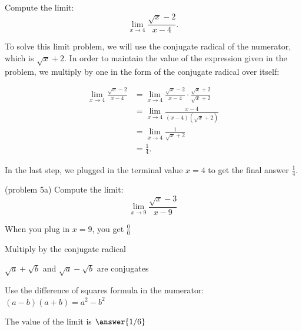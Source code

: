 \documentclass[handout]{ximera}
\begin{document}
\begin{example}[example 5]
Compute the limit:
\[\lim_{x \to 4} \frac{\sqrt{x} - 2}{x-4}.\]

To solve this limit problem, we will use the conjugate radical of the
numerator, which is $\sqrt{x} + 2$.  In order to maintain the value of
the expression given in the problem, we multiply by one in the form of the conjugate radical
over itself:



\begin{align*}
\lim_{x \to 4} \frac{\sqrt{x}- 2}{x-4} &=
\lim_{x \to 4} \frac{\sqrt{x} -2}{x-4}\cdot \frac{\sqrt{x} +2}{\sqrt{x}+2} \\[.4 em]
 &= \lim_{x \to 4} \frac{x-4}{(x-4)(\sqrt{x}+2)} \\[.4 em]
&= \lim_{x \to 4}\frac{1}{\sqrt{x}+2} \\[.4 em]
&= \frac 14.
\end{align*}

In the last step, we plugged in the terminal value $x=4$ to get the final answer $\frac14$.

\end{example}



\begin{problem}(problem 5a)
  Compute the limit:
  \[
  \lim_{x \to 9} \frac{\sqrt{x}-3}{x-9}
  \]
  
    \begin{hint}
      When you plug in $x = 9$, you get $\frac00$
    \end{hint}
    \begin{hint}
      Multiply by the conjugate radical
    \end{hint}
    \begin{hint}
      $\sqrt a + \sqrt b$ and $\sqrt a - \sqrt b$ are conjugates
    \end{hint}
    \begin{hint}
      Use the difference of squares formula in the numerator: $(a-b)(a+b) = a^2 - b^2$ 
    \end{hint}
    
		The value of the limit is
		 $\answer{1/6}$
		
\end{problem}
\end{document}
